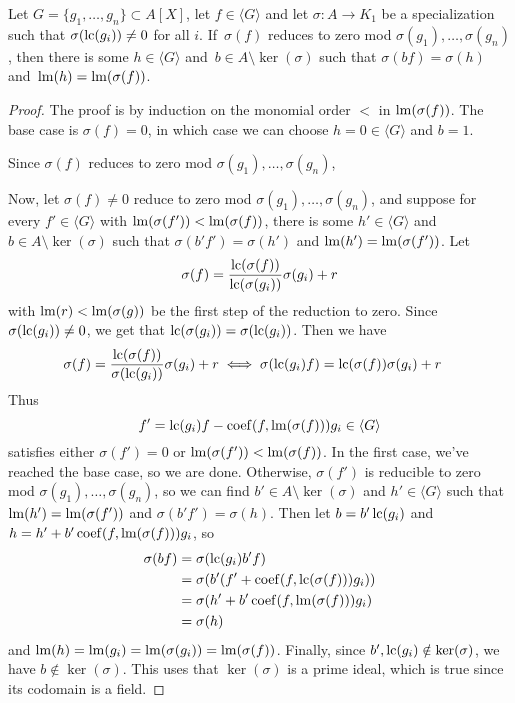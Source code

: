 \begin{lemma}\label{lem:div_to_ps_div}
  Let $G = \{g_{1}, \dots, g_{n}\} \subset A[X]$, let $f \in \langle G \rangle$ and let $\sigma : A \to K_{1}$ be a specialization such that $\sigma(\operatorname{lc}(g_{i})) \neq 0$ for all $i$. If $\,\sigma(f)$ reduces to zero mod $\sigma(g_{1}), \dots, \sigma(g_{n})$, then there is some $h \in \langle G \rangle$ and $\,b \in A \setminus \ker(\sigma)$ such that $\sigma(bf) = \sigma(h)$ and $\,\operatorname{lm}(h) = \operatorname{lm}(\sigma(f))$.
\end{lemma}
\begin{proof}
  The proof is by induction on the monomial order $<$ in $\operatorname{lm}(\sigma(f))$. The base case is $\sigma(f) = 0$, in which case we can choose $h = 0 \in \langle G \rangle$ and $b = 1$.

  Since $\sigma(f)$ reduces to zero mod $\sigma(g_{1}), \dots, \sigma(g_{n})$,

  Now, let $\sigma(f) \neq 0$ reduce to zero mod $\sigma(g_{1}), \dots, \sigma(g_{n})$, and suppose for every $f' \in \langle G \rangle$ with $\operatorname{lm}(\sigma(f')) < \operatorname{lm}(\sigma(f))$, there is some $h' \in \langle G \rangle$ and $b \in A \setminus \ker(\sigma)$ such that $\sigma(b'f') = \sigma(h')$ and $\operatorname{lm}(h') = \operatorname{lm}(\sigma(f'))$. Let
  \[\sigma(f) = \frac{\operatorname{lc}(\sigma(f))}{\operatorname{lc}(\sigma(g_{i}))} \sigma(g_{i}) + r\]
  with $\operatorname{lm}(r) < \operatorname{lm}(\sigma(g))$ be the first step of the reduction to zero. Since $\sigma(\operatorname{lc}(g_{i})) \neq 0$, we get that $\operatorname{lc}(\sigma(g_{i})) = \sigma(\operatorname{lc}(g_{i}))$. Then we have
  \begin{align*}
    \sigma(f) &= \frac{\operatorname{lc}(\sigma(f))}{\sigma(\operatorname{lc}(g_{i}))} \sigma(g_{i}) + r \iff \sigma(\operatorname{lc}(g_{i}) f) = \operatorname{lc}(\sigma(f)) \sigma(g_{i}) + r
  \end{align*}
  Thus
  \[f' = \operatorname{lc}(g_{i})f - \operatorname{coef}(f, \operatorname{lm}(\sigma(f))) g_{i} \in \langle G \rangle\]
  satisfies either $\sigma(f') = 0$ or $\operatorname{lm}(\sigma(f')) < \operatorname{lm}(\sigma(f))$. In the first case, we've reached the base case, so we are done. Otherwise, $\sigma(f')$ is reducible to zero mod $\sigma(g_{1}), \dots, \sigma(g_{n})$, so we can find $b' \in A \setminus \ker(\sigma)$ and $h' \in \langle G \rangle$ such that $\operatorname{lm}(h') = \operatorname{lm}(\sigma(f'))$ and $\sigma(b' f') = \sigma(h)$. Then let $b = b' \operatorname{lc}(g_{i})$ and $h = h' + b' \operatorname{coef}(f, \operatorname{lm}(\sigma(f))) g_{i}$, so
  \begin{align*}
    \sigma(b f) &= \sigma(\operatorname{lc}(g_{i}) b' f) \\
           &= \sigma(b' (f' + \operatorname{coef}(f, \operatorname{lc}(\sigma(f))) g_{i})) \\
           &= \sigma(h' + b' \operatorname{coef}(f, \operatorname{lm}(\sigma(f))) g_{i}) \\
           &= \sigma(h)
  \end{align*}
  and $\operatorname{lm}(h) = \operatorname{lm}(g_{i}) = \operatorname{lm}(\sigma(g_{i})) = \operatorname{lm}(\sigma(f))$. Finally, since $b', \operatorname{lc}(g_{i}) \notin \ker(\sigma)$, we have $b \notin \ker(\sigma)$. This uses that $\ker(\sigma)$ is a prime ideal, which is true since its codomain is a field.
\end{proof}
